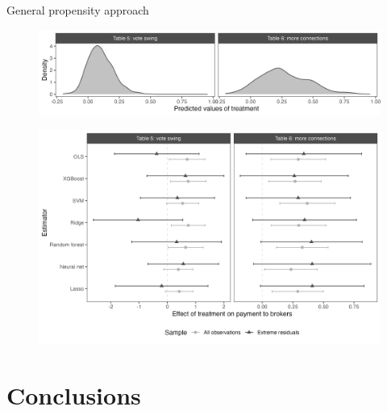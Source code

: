 \documentclass[10pt,table,aspectratio=169]{beamer}
\begin{document}
\begin{frame}[plain, label = two_dimensions]{General propensity approach}

\begin{figure}[H]
 \includegraphics[width=0.7\linewidth]{figures/observational_density_predicted.png}
\end{figure}
\begin{figure}[H]
 \includegraphics[height=0.6\textheight]{figures/observational_coefplot_predicted.png}
\end{figure}

\end{frame}


\section{Conclusions}
\end{document}
